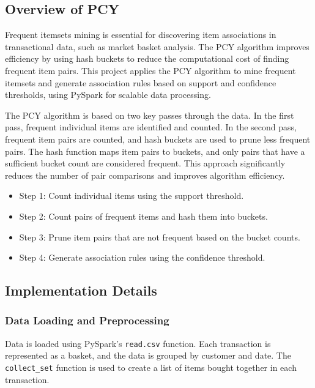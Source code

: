 \subsection{Overview of PCY}
\label{subsec:overview-of-pcy}
Frequent itemsets mining is essential for discovering item associations in transactional data, such as market basket analysis.
The PCY algorithm improves efficiency by using hash buckets to reduce the computational cost of finding frequent item pairs.
This project applies the PCY algorithm to mine frequent itemsets and generate association rules based on support and confidence thresholds, using PySpark for scalable data processing.

The PCY algorithm is based on two key passes through the data.
In the first pass, frequent individual items are identified and counted.
In the second pass, frequent item pairs are counted, and hash buckets are used to prune less frequent pairs.
The hash function maps item pairs to buckets, and only pairs that have a sufficient bucket count are considered frequent.
This approach significantly reduces the number of pair comparisons and improves algorithm efficiency.

\begin{itemize}
    \item Step 1: Count individual items using the support threshold.
    \item Step 2: Count pairs of frequent items and hash them into buckets.
    \item Step 3: Prune item pairs that are not frequent based on the bucket counts.
    \item Step 4: Generate association rules using the confidence threshold.
\end{itemize}

\subsection{Implementation Details}
\label{subsec:implementation-details}

\subsubsection{Data Loading and Preprocessing}
Data is loaded using PySpark’s \texttt{read.csv} function.
Each transaction is represented as a basket, and the data is grouped by customer and date.
The \texttt{collect\_set} function is used to create a list of items bought together in each transaction.

